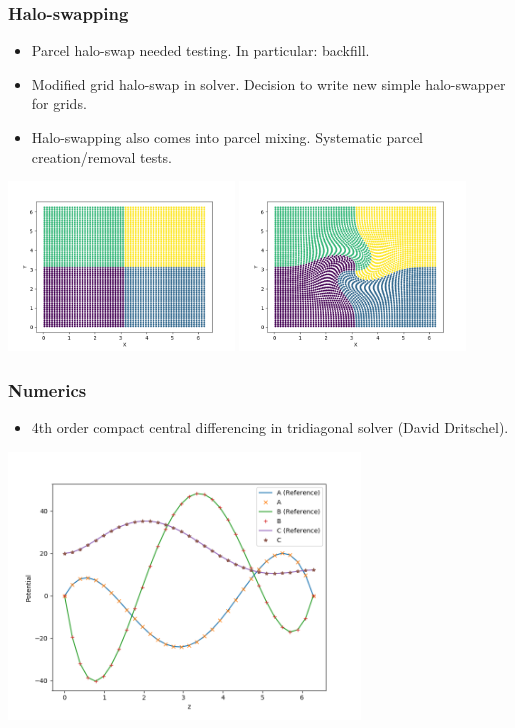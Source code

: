 \documentclass{beamer}
\begin{document}
\begin{frame}
\frametitle{Halo-swapping}
\begin{itemize}
\item Parcel halo-swap needed testing. In particular: backfill.
\item Modified grid halo-swap in solver. Decision to write new simple halo-swapper for grids. 
\item Halo-swapping also comes into parcel mixing. Systematic parcel creation/removal tests.
\end{itemize}

\includegraphics[width=0.45\textwidth]{pmpic_images/vel0.png} 
\includegraphics[width=0.45\textwidth]{pmpic_images/vel1.png} 

\end{frame}

\begin{frame}
\frametitle{Numerics}
\begin{itemize}
\item 4th order compact central differencing in tridiagonal solver (David Dritschel).
\end{itemize}

\includegraphics[width=0.70\textwidth]{pmpic_images/solution.png} 

\end{frame}
\end{document}
